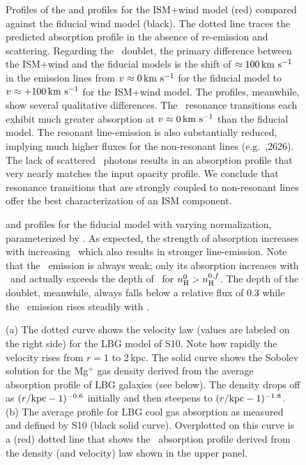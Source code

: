\documentclass[12pt,preprint]{aastex}
\begin{document}
\begin{figure}
\caption{
Profiles of the  and  profiles for the ISM+wind
model (red) compared against the fiducial wind model (black). 
The dotted line traces the predicted absorption profile in the absence
of re-emission and scattering.
Regarding the ~doublet, the primary difference between the
ISM+wind and the fiducial models is the shift of $\approx 100 \, {\rm km~s^{-1}}$
in the emission lines from $v \approx 0 \, {\rm km~s^{-1}}$ for the fiducial
model to $v \approx +100\, {\rm km~s^{-1}}$ for the ISM+wind model. 
The  profiles, meanwhile, show several qualitative differences. 
The \feiid\ resonance transitions each exhibit much
greater absorption at $v \approx 0 \, {\rm km~s^{-1}}$ than the fiducial model.
The resonant line-emission is also substantially
reduced, implying much higher fluxes for the non-resonant lines (e.g.\
\feiic,2626).  The lack of scattered \feiia\ photons results in an
absorption profile that very nearly matches the input opacity profile.
We conclude that resonance transitions that are strongly coupled to
non-resonant lines offer the best
characterization of an ISM component.
}
\label{fig:ISM_spec}
\end{figure}

\begin{figure}
\caption{
 and  profiles for the fiducial model with
varying normalization, parameterized by \nhn.  As expected, the
strength of absorption increases with increasing \nhn\ which also
results in stronger line-emission.  Note that the \feiia\ emission is
always weak; only its absorption increases with \nhn\ and actually exceeds
the depth of \feiib\ for $n_{\rm H}^0 > n_{\rm H}^{0,f}$.  The depth of the
 doublet, meanwhile, always falls below a relative flux of
0.3 while the \mgiib\ emission rises steadily with \nhn.
}
\label{fig:norm}
\end{figure}

\begin{figure}
\caption{
(a) The dotted curve shows the velocity law (values are labeled on the
right side) for the LBG model
of S10.  Note how rapidly the velocity rises from $r =
1$ to 2\,kpc.  The solid curve shows the Sobolev solution for the
Mg$^+$ gas
density derived from 
the average absorption profile of LBG galaxies (see below).
The density drops off as $(r/{\rm kpc}-1)^{-0.6}$ initially and then
steepens to $(r/{\rm kpc}-1)^{-1.8}$.
(b) The average profile for LBG cool gas absorption as
measured and defined by S10
(black solid curve).  Overplotted on this curve is a (red) dotted line that
shows the \mgiia\ absorption profile derived from the density (and velocity)
law shown in the upper panel.  
}
\label{fig:LBG_Sobolev}
\end{figure}
\end{document}
